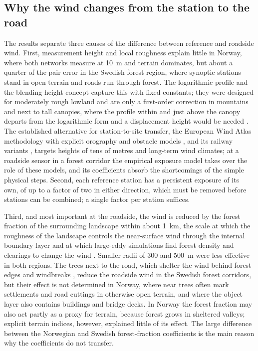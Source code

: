 \subsection{Why the wind changes from the station to the road}
The results separate three causes of the difference between reference and roadside wind. First, measurement height and local roughness explain little in Norway, where both networks measure at \SI{10}{m} and terrain dominates, but about a quarter of the pair error in the Swedish forest region, where synoptic stations stand in open terrain and roads run through forest. The logarithmic profile and the blending-height concept \citep{Wieringa1986} capture this with fixed constants; they were designed for moderately rough lowland and are only a first-order correction in mountains and next to tall canopies, where the profile within and just above the canopy departs from the logarithmic form and a displacement height would be needed \citep{Raupach1994,Finnigan2000,Belcher2012}. The established alternative for station-to-site transfer, the European Wind Atlas methodology with explicit orography and obstacle models \citep{TroenPetersen1989}, and its railway variants \citep{Herb2007}, targets heights of tens of metres and long-term wind climates; at a roadside sensor in a forest corridor the empirical exposure model takes over the role of these models, and its coefficients absorb the shortcomings of the simple physical steps. Second, each reference station has a persistent exposure of its own, of up to a factor of two in either direction, which must be removed before stations can be combined; a single factor per station suffices.

Third, and most important at the roadside, the wind is reduced by the forest fraction of the surrounding landscape within about \SI{1}{km}, the scale at which the roughness of the landscape controls the near-surface wind through the internal boundary layer \citep{Garratt1990} and at which large-eddy simulations find forest density and clearings to change the wind \citep{Chaudhari2026,Topic2026}. Smaller radii of 300 and \SI{500}{m} were less effective in both regions. The trees next to the road, which shelter the wind behind forest edges and windbreaks \citep{HeislerDeWalle1988,DupontBrunet2008}, reduce the roadside wind in the Swedish forest corridors, but their effect is not determined in Norway, where near trees often mark settlements and road cuttings in otherwise open terrain, and where the object layer also contains buildings and bridge decks. In Norway the forest fraction may also act partly as a proxy for terrain, because forest grows in sheltered valleys; explicit terrain indices, however, explained little of its effect. The large difference between the Norwegian and Swedish forest-fraction coefficients is the main reason why the coefficients do not transfer.

